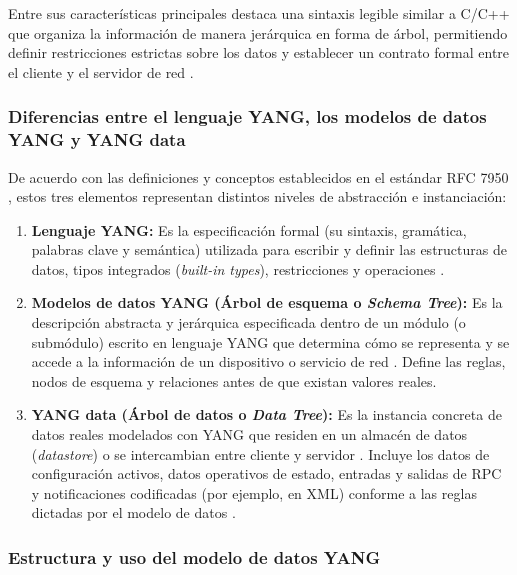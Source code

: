 \documentclass[12pt,a4paper]{article}
\begin{document}
Entre sus características principales destaca una sintaxis legible similar a C/C++ que organiza la información de manera jerárquica en forma de árbol, permitiendo definir restricciones estrictas sobre los datos y establecer un contrato formal entre el cliente y el servidor de red \parencite{bjorklund2016rfc7950}.

\subsubsection{Diferencias entre el lenguaje YANG, los modelos de datos YANG y YANG data}

De acuerdo con las definiciones y conceptos establecidos en el estándar RFC 7950 \parencite{bjorklund2016rfc7950}, estos tres elementos representan distintos niveles de abstracción e instanciación:

\begin{enumerate}
    \item \textbf{Lenguaje YANG:} Es la especificación formal (su sintaxis, gramática, palabras clave y semántica) utilizada para escribir y definir las estructuras de datos, tipos integrados (\textit{built-in types}), restricciones y operaciones \parencite{bjorklund2016rfc7950}.
    \item \textbf{Modelos de datos YANG (Árbol de esquema o \textit{Schema Tree}):} Es la descripción abstracta y jerárquica especificada dentro de un módulo (o submódulo) escrito en lenguaje YANG que determina cómo se representa y se accede a la información de un dispositivo o servicio de red \parencite{bjorklund2016rfc7950}. Define las reglas, nodos de esquema y relaciones antes de que existan valores reales.
    \item \textbf{YANG data (Árbol de datos o \textit{Data Tree}):} Es la instancia concreta de datos reales modelados con YANG que residen en un almacén de datos (\textit{datastore}) o se intercambian entre cliente y servidor \parencite{bjorklund2016rfc7950}. Incluye los datos de configuración activos, datos operativos de estado, entradas y salidas de RPC y notificaciones codificadas (por ejemplo, en XML) conforme a las reglas dictadas por el modelo de datos \parencite{bjorklund2016rfc7950}.
\end{enumerate}

\subsubsection{Estructura y uso del modelo de datos YANG}
\end{document}
